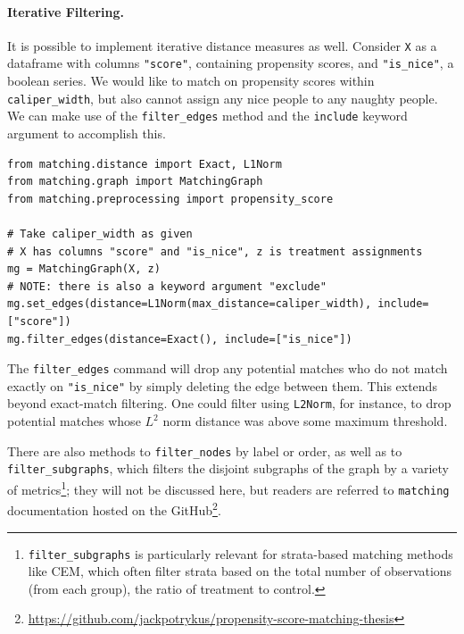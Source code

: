 \documentclass[11pt]{extarticle}
\begin{document}
\paragraph{Iterative Filtering.} It is possible to implement iterative distance measures as well. Consider \texttt{X} as a dataframe with columns \texttt{"score"}, containing propensity scores, and \texttt{"is\_nice"}, a boolean series. We would like to match on propensity scores within \texttt{caliper\_width}, but also cannot assign any nice people to any naughty people. We can make use of the \texttt{filter\_edges} method and the \texttt{include} keyword argument to accomplish this.
\begin{verbatim}
from matching.distance import Exact, L1Norm
from matching.graph import MatchingGraph
from matching.preprocessing import propensity_score

# Take caliper_width as given
# X has columns "score" and "is_nice", z is treatment assignments
mg = MatchingGraph(X, z)
# NOTE: there is also a keyword argument "exclude"
mg.set_edges(distance=L1Norm(max_distance=caliper_width), include=["score"])
mg.filter_edges(distance=Exact(), include=["is_nice"])
\end{verbatim}
The \texttt{filter\_edges} command will drop any potential matches who do not match exactly on \texttt{"is\_nice"} by simply deleting the edge between them. This extends beyond exact-match filtering. One could filter using \texttt{L2Norm}, for instance, to drop potential matches whose $L^2$ norm distance was above some maximum threshold.

There are also methods to \texttt{filter\_nodes} by label or order, as well as to \texttt{filter\_subgraphs}, which filters the disjoint subgraphs of the graph by a variety of metrics\footnote{\texttt{filter\_subgraphs} is particularly relevant for strata-based matching methods like CEM, which often filter strata based on the total number of observations (from each group), the ratio of treatment to control.}; they will not be discussed here, but readers are referred to \texttt{matching} documentation hosted on the GitHub\footnote{\url{https://github.com/jackpotrykus/propensity-score-matching-thesis}}.
\end{document}
